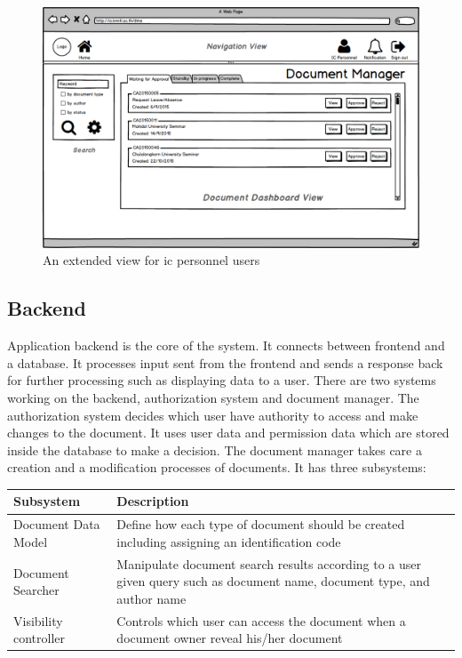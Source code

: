 \begin{figure}[h!]
	\centering
	\caption{An extended view for \gls{ic} personnel users}
	\label{fig:mockup-view-approval}
	\includegraphics[scale=0.35]{res/software-design/view-approval}
\end{figure}

\subsection{Backend}
Application backend is the core of the system.
It connects between frontend and a database.
It processes input sent from the frontend and sends a response back for further processing such as displaying data to a user.
There are two systems working on the backend, authorization system and document manager.
The authorization system decides which user have authority to access and make changes to the document.
It uses user data and permission data which are stored inside the database to make a decision.
The document manager takes care a creation and a modification processes of documents.
It has three subsystems:
\begin{table}
	\centering
	\begin{tabular}{lL{6.5cm}}
		\hline
		Subsystem & Description \\
		\hline
		Document Data Model & Define how each type of document should be created including assigning an identification code \\
		Document Searcher & Manipulate document search results according to a user given query such as document name, document type, and author name \\
		Visibility controller & Controls which user can access the document when a document owner reveal his/her document \\
		\hline
	\end{tabular}
\end{table}

